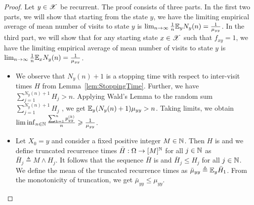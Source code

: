 \documentclass[letterpaper,10pt,english]{article}
\begin{document}
\begin{proof} 
Let $y \in \mathscr{X}$ be recurrent. 
The proof consists of three parts. 
In the first two parts, we will show that starting from the state $y$, we have the limiting empirical average of mean number of visits to state $y$ is $\lim_{n \to \infty}\frac{1}{n}\mathbb{E}_yN_y(n) = \frac{1}{\mu_{yy}}$. 
In the third part, we will show that for any starting state $x \in \mathscr{X}$ such that $f_{xy}=1$, we have  the limiting empirical average of mean number of visits to state $y$ is $\lim_{n \to \infty}\frac{1}{n}\mathbb{E}_xN_y(n) = \frac{1}{\mu_{yy}}$. 
\begin{itemize}
\item[Lower bound:]
We observe that $N_y(n)+1$ is a stopping time with respect to inter-visit times $H$ from Lemma~\ref{lem:StoppingTime}. 
Further, we have $\sum_{j=1}^{N_y(n)+1}H_j > n$. 
Applying Wald's Lemma to the random sum $\sum_{j=1}^{N_y(n)+1}H_j$ , we get $\mathbb{E}_y(N_y(n)+1)\mu_{yy} > n$. 
Taking limits, we obtain $\lim\inf_{n \in \mathbb{N}}\frac{\sum_{k=1}^np_{yy}^{(k)}}{n} \geqslant \frac{1}{\mu_{yy}}$. 

\item[Upper bound:] 
Let $X_0 = y$ and consider a fixed positive integer $M\in \mathbb{N}$. 
Then $H$ is \iid and we define truncated recurrence times $\bar{H}:\Omega\to[M]^{\mathbb{N}}$ for all $j \in \mathbb{N}$ as  $\bar{H}_j \triangleq M \wedge H_j$. 
It follows that the sequence $\bar{H}$ is \iid and $\bar{H}_j \le H_j$ for all $j \in \mathbb{N}$. 
We define the mean of the truncated recurrence times as $\bar{\mu}_{yy} \triangleq \mathbb{E}_y\bar{H}_1$. 
From the monotonicity of truncation, we get $\bar{\mu}_{yy} \le \mu_{yy}$.  


\end{itemize}
\end{proof}
\end{document}
